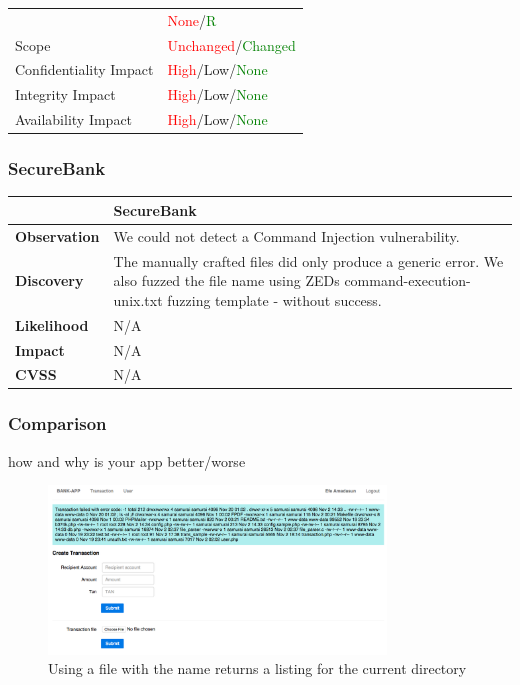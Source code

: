 \begin{tabular*}{\textwidth}{ p{} | p{} }
\begin{tabular}{l | l}
            User Interaction        & \textcolor{red}{None}/\textcolor{Green}{R} \\
            Scope                   & \textcolor{red}{Unchanged}/\textcolor{Green}{Changed} \\
            Confidentiality Impact  & \textcolor{red}{High}/\textcolor{BurntOrange}{Low}/\textcolor{Green}{None} \\
            Integrity Impact        & \textcolor{red}{High}/\textcolor{BurntOrange}{Low}/\textcolor{Green}{None} \\
            Availability Impact     & \textcolor{red}{High}/\textcolor{BurntOrange}{Low}/\textcolor{Green}{None}
        \end{tabular}
	\\ \hline
\end{tabular*}

\subsubsection{SecureBank}
\begin{tabular*}{\textwidth}{ p{} | p{} }\hline
    & \textbf{SecureBank} \\ \hline
    \textbf{Observation} & 
    	We could not detect a Command Injection vulnerability.
    \\
    \textbf{Discovery} &
    	The manually crafted files did only produce a generic error.
    	We also fuzzed the file name using ZEDs command-execution-unix.txt fuzzing template - without success.
    \\
    \textbf{Likelihood} & 
    	N/A
    \\
    \textbf{Impact} & 
    	N/A
	\\
    \textbf{CVSS} &
        N/A
	\\ \hline
\end{tabular*}

\subsubsection{Comparison}
how and why is your app better/worse
\begin{figure}[p]
    \centering
    \includegraphics[width=0.8\textwidth]{figures/OTG-INPVAL-013-1.png}
    \caption{Using a file with the name  returns a listing for the current directory}
    \label{fig:OTG_AUTHN_004_1}
\end{figure}
\clearpage